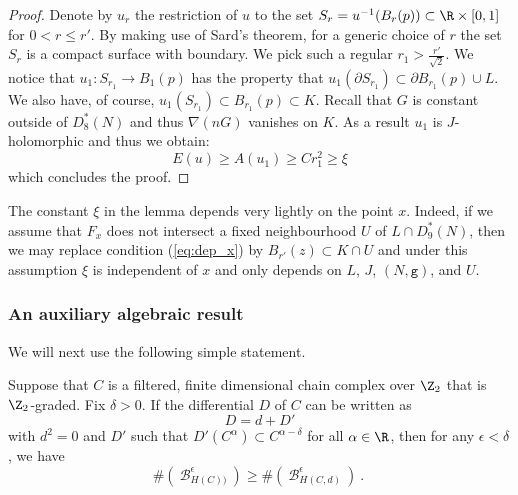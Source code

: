 \begin{proof}
 
 Denote by $u_{r}$ the restriction of $u$ to the set $S_{r}=u^{-1}(B_{r}(p))\subset \R\times [0,1]$ for $ 0 < r \leq r'$. By making use of Sard's theorem, for a generic choice of $r$ the set $S_{r}$ is a compact surface with boundary. We pick such a regular $r_{1}> \frac{r'}{\sqrt{2}}$. We notice that $u_{1}:S_{r_{1}}\to B_{1}(p)$ has the property that $u_{1}(\partial S_{r_{1}})\subset \partial B_{r_{1}}(p)\cup L$. We also have, of course, $u_{1}(S_{r_{1}})\subset B_{r_{1}}(p)\subset K$. Recall that $G$ is constant outside of $D^{\ast}_{8}(N)$ and thus $\nabla (nG)$ vanishes on $K$.
 As a result $u_{1}$ is $J$-holomorphic and thus we obtain:
 $$E(u)\geq A(u_{1})\geq Cr_{1}^{2}\geq \xi$$
 which concludes the proof. 
   \end{proof}
  
  \begin{rem}\label{rem:dep_onx}
  The constant $\xi$ in the lemma depends very lightly on the point $x$. Indeed, if we  assume that $F_{x}$ does not intersect a fixed neighbourhood
 $U$ of $L\cap D^{\ast}_{9}(N)$, then we may replace condition
 (\ref{eq:dep_x}) by $B_{r'}(z) \subset K\cap U$ and under this assumption
 $\xi$ is independent of $x$ and only depends on $L$, $J$, $(N,\mathtt{g})$, and $U$.
  
  \end{rem}
  
  
  
  \subsubsection{An auxiliary algebraic  result}
We will next use the following simple  statement. 
  
  \begin{lem}\label{lem:bar_counts2}
  Suppose that $C$ is a filtered, finite dimensional chain complex over $\Z_2$ that is $\Z_2$-graded. 
  Fix $\delta>0$.
  If the differential $D$ of $C$ can be written as
  $$D=d+D'$$ with $d^{2}=0$ and $D'$ such that $D'(C^{\alpha})\subset C^{\alpha-\delta}$
  for all $\alpha\in\R$, then for any $\epsilon<\delta$, we 
  have $$\#(\ \mathcal{B}^{\epsilon}_{H(C))}\ )\geq \#(\ \mathcal{B}^{\epsilon}_{H(C,d)} \ )~.~$$
  \end{lem}
  
